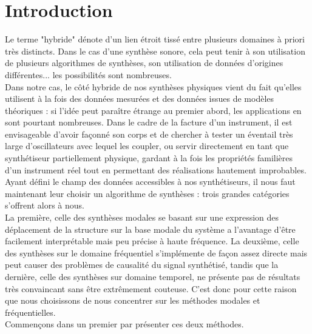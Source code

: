 \chapter*{Introduction}

Le terme "hybride" dénote d'un lien étroit tissé entre plusieurs domaines à priori très distincts. Dans le cas d'une synthèse sonore, cela peut tenir à son utilisation de plusieurs algorithmes de synthèses, son utilisation de données d'origines différentes... les possibilités sont nombreuses.\\
Dans notre cas, le côté hybride de nos synthèses physiques vient du fait qu'elles utilisent à la fois des données mesurées et des données issues de modèles théoriques : si l'idée peut paraître étrange au premier abord, les applications en sont pourtant nombreuses. Dans le cadre de la facture d'un instrument, il est envisageable d'avoir façonné son corps et de chercher à tester un éventail très large d'oscillateurs avec lequel les coupler, ou servir directement en tant que synthétiseur partiellement physique, gardant à la fois les propriétés familières d'un instrument réel tout en permettant des réalisations hautement improbables.\\
Ayant défini le champ des données accessibles à nos synthétiseurs, il nous faut maintenant leur choisir un algorithme de synthèses : trois grandes catégories s'offrent alors à nous.\\
La première, celle des synthèses modales se basant sur une expression des déplacement de la structure sur la base modale du système a l'avantage d'être facilement interprétable mais peu précise à haute fréquence. La deuxième, celle des synthèses sur le domaine fréquentiel s'implémente de façon assez directe mais peut causer des problèmes de causalité du signal synthétisé, tandis que la dernière, celle des synthèses sur domaine temporel, ne présente pas de résultats très convaincant sans être extrêmement couteuse. C'est donc pour cette raison que nous choisissons de nous concentrer sur les méthodes modales et fréquentielles.\\
Commençons dans un premier par présenter ces deux méthodes.